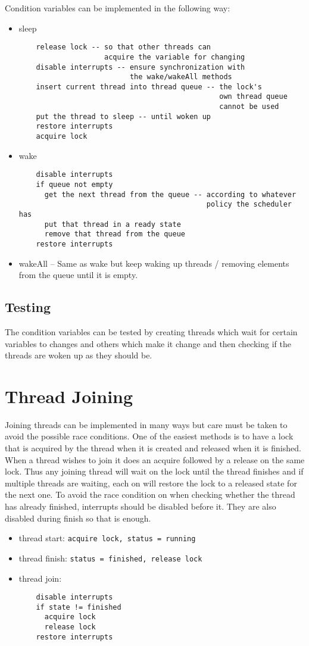 \documentclass[a4paper,10pt]{article}
\begin{document}
Condition variables can be implemented in the following way:
\begin{itemize}
\item sleep
	\begin{verbatim}
	release lock -- so that other threads can 
	                acquire the variable for changing
	disable interrupts -- ensure synchronization with 
	                      the wake/wakeAll methods
	insert current thread into thread queue -- the lock's 
	                                           own thread queue 
	                                           cannot be used
	put the thread to sleep -- until woken up
	restore interrupts
	acquire lock
	\end{verbatim}
\item wake
	\begin{verbatim}
	disable interrupts
	if queue not empty
	  get the next thread from the queue -- according to whatever 
	                                        policy the scheduler has
	  put that thread in a ready state
	  remove that thread from the queue
	restore interrupts
	\end{verbatim}
\item wakeAll -- Same as wake but keep waking up threads / removing elements from the queue until it is empty.
\end{itemize}

\subsection{Testing}
The condition variables can be tested by creating threads which wait for certain variables
to changes and others which make it change and then checking if the threads are woken up as they should be.

\section{Thread Joining}

Joining threads can be implemented in many ways but care must be taken to avoid the possible race conditions.
One of the easiest methods is to have a lock that is acquired by the thread when it is created and released when 
it is finished. When a thread wishes to join it does an acquire followed by a release on the same lock. Thus any 
joining thread will wait on the lock until the thread finishes and if multiple threads are waiting, each on will restore the lock to a released state for the next one. To avoid the race condition on when checking whether the thread has already finished, interrupts should be disabled before it. They are also disabled during finish so that is enough.
\begin{itemize}
\item thread start: \texttt{acquire lock, status = running}
\item thread finish: \texttt{status = finished, release lock}
\item thread join:
	\begin{verbatim}
	disable interrupts
 	if state != finished
	  acquire lock
	  release lock
	restore interrupts
	\end{verbatim}
\end{itemize}
\end{document}
